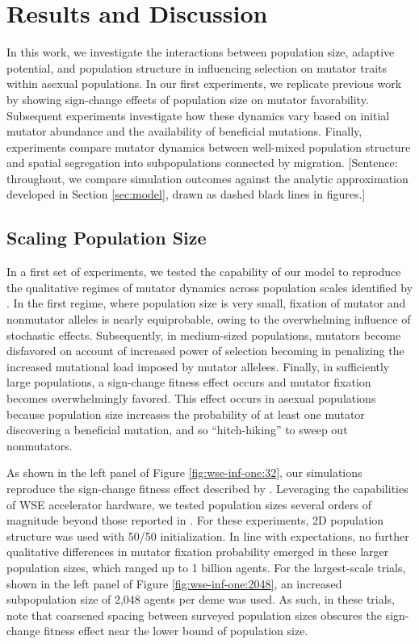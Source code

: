\section{Results and Discussion} \label{sec:results}

In this work, we investigate the interactions between population size, adaptive potential, and population structure in influencing selection on mutator traits within asexual populations.
In our first experiments, we replicate previous work by \citet{raynes2018sign} showing sign-change effects of population size on mutator favorability.
Subsequent experiments investigate how these dynamics vary based on initial mutator abundance and the availability of beneficial mutations.
Finally, experiments compare mutator dynamics between well-mixed population structure and spatial segregation into subpopulations connected by migration.
[Sentence: throughout, we compare simulation outcomes against the analytic approximation developed in Section \ref{sec:model}, drawn as dashed black lines in figures.]

\subsection{Scaling Population Size}
\label{sec:scaling-population-size}

In a first set of experiments, we tested the capability of our model to reproduce the qualitative regimes of mutator dynamics across population scales identified by \citet{raynes2018sign}.
In the first regime, where population size is very small, fixation of mutator and nonmutator alleles is nearly equiprobable, owing to the overwhelming influence of stochastic effects.
Subsequently, in medium-sized populations, mutators become disfavored on account of increased power of selection becoming in penalizing the increased mutational load imposed by mutator allelees.
Finally, in sufficiently large populations, a sign-change fitness effect occurs and mutator fixation becomes overwhelmingly favored.
This effect occurs in asexual populations because population size increases the probability of at least one mutator discovering a beneficial mutation, and so ``hitch-hiking'' to sweep out nonmutators.



As shown in the left panel of Figure \ref{fig:wse-inf-one:32}, our simulations reproduce the sign-change fitness effect described by \citet{raynes2018sign}.
Leveraging the capabilities of WSE accelerator hardware, we tested population sizes several orders of magnitude beyond those reported in \citet{raynes2018sign}.
For these experiments, 2D population structure was used with 50/50 initialization.
In line with expectations, no further qualitative differences in mutator fixation probability emerged in these larger population sizes, which ranged up to 1 billion agents.
For the largest-scale trials, shown in the left panel of Figure \ref{fig:wse-inf-one:2048}, an increased subpopulation size of 2,048 agents per deme was used.
As such, in these trials, note that coarsened spacing between surveyed population sizes obscures the sign-change fitness effect near the lower bound of population size.

